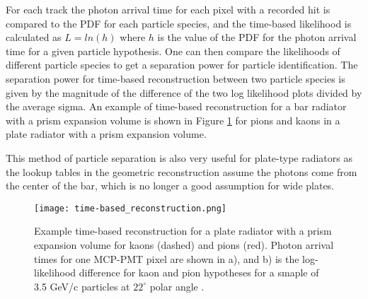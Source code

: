 For each track the photon arrival time for each pixel with a recorded hit is compared to the PDF for each particle species, and the time-based likelihood is calculated as $L = ln(h)$ where $h$ is the value of the PDF for the photon arrival time for a given particle hypothesis. One can then compare the likelihoods of different particle species to get a separation power for particle identification. The separation power for time-based reconstruction between two particle species is given by the magnitude of the difference of the two log likelihood plots divided by the average sigma. An example of time-based reconstruction for a bar radiator with a prism expansion volume is shown in Figure \ref{fig:time-based_reco} for pions and kaons in a plate radiator with a prism expansion volume.

This method of particle separation is also very useful for plate-type radiators as the lookup tables in the geometric reconstruction assume the photons come from the center of the bar, which is no longer a good assumption for wide plates. 

\begin{figure}[ht]
	\centering
	\texttt{[image: time-based\_reconstruction.png]}
	\caption{Example time-based reconstruction for a plate radiator with a prism expansion volume for kaons (dashed) and pions (red). Photon arrival times for one MCP-PMT pixel are shown in a), and b) is the log-likelihood difference for kaon and pion hypotheses for a smaple of 3.5 GeV/c particles at $22^\circ$ polar angle \cite{PANDA_barrel}.}
	\label{fig:time-based_reco}
\end{figure}